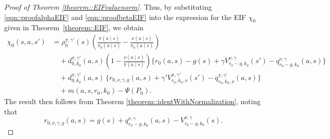 \documentclass[11pt]{article}
\theoremstyle{plain}
\begin{document}
\begin{proof}[Proof of Theorem \ref{theorem::EIFvaluenorm}]
Thus, by substituting \eqref{eqn::proofalphaEIF} and \eqref{eqn::proofbetaEIF} into the expression for the EIF $\chi_0$ given in Theorem~\ref{theorem::EIF}, we obtain
\begin{equation}
\label{eqnproof:firstEIF}
\begin{aligned}
\chi_0(s,a,s')
&= \rho_0^{\pi,\gamma'}(s)\left(\frac{\pi(a\mid s)}{\pi_0(a\mid s)} - \frac{\nu(a\mid s)}{\pi_0(a\mid s)}\right) \\[4pt]
&\quad + d_{0,k_0}^{\pi,\gamma'}(a,s)\left(1 - \frac{\nu(a \mid s)}{\pi(a \mid s)}\right)
          \bigl\{r_0(a,s) - g(s) + \gamma V_{r_0-g, k_0}^{\nu,\gamma}(s') - q_{r_0-g, k_0}^{\nu,\gamma}(a,s)\bigr\} \\[4pt]
&\quad + d_{0,k_0}^{\pi,\gamma'}(a,s)\,\bigl\{r_{0,\nu,\gamma,g}(a,s) + \gamma' V_{r_0, k_0,\nu}^{\pi,\gamma'}(s') - q_{r_0, k_0,\nu}^{\pi,\gamma'}(a,s)\bigr\} \\[4pt]
&\quad + m(a,s, r_0, k_0) - \Psi(P_0).
\end{aligned}
\end{equation}
 The result then follows from Theorem \ref{theorem::identWithNormalization}, noting that
 $$r_{0,\nu,\gamma,g}(a,s) = g(s) + q_{r_0-g, k_0}^{\nu,\gamma}(a,s) - V_{r_0-g, k_0}^{\nu,\gamma}(s).$$



 
 



 



   
\end{proof}



 
\end{document}
